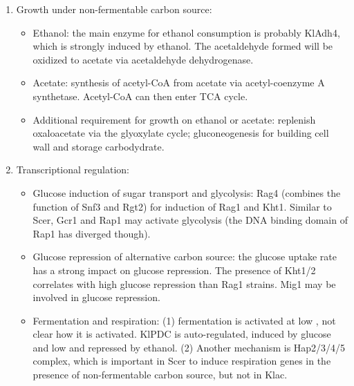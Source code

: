 \documentclass{report}
\begin{document}
\begin{enumerate}
	\item Growth under non-fermentable carbon source: 
	\begin{itemize}
		\item Ethanol: the main enzyme for ethanol consumption is probably KlAdh4, which is strongly induced by ethanol. The acetaldehyde formed will be oxidized to acetate via acetaldehyde dehydrogenase. 
		\item Acetate: synthesis of acetyl-CoA from acetate via acetyl-coenzyme A synthetase. Acetyl-CoA can then enter TCA cycle. 
		\item Additional requirement for growth on ethanol or acetate: replenish oxaloacetate via the glyoxylate cycle; gluconeogenesis for building cell wall and storage carbodydrate. 
	\end{itemize}
	
	\item Transcriptional regulation: 
	\begin{itemize}
		\item Glucose induction of sugar transport and glycolysis: Rag4 (combines the function of Snf3 and Rgt2) for induction of Rag1 and Kht1. Similar to Scer, Gcr1 and Rap1 may activate glycolysis (the DNA binding domain of Rap1 has diverged though). 
		\item Glucose repression of alternative carbon source: the glucose uptake rate has a strong impact on glucose repression. The presence of Kht1/2 correlates with high glucose repression than Rag1 strains. Mig1 may be involved in glucose repression. 
		\item Fermentation and respiration: (1) fermentation is activated at low , not clear how it is activated. KlPDC is auto-regulated, induced by glucose and low  and repressed by ethanol. (2) Another mechanism is Hap2/3/4/5 complex, which is important in Scer to induce respiration genes in the presence of non-fermentable carbon source, but not in Klac. 
	\end{itemize}
\end{enumerate}
\end{document}
